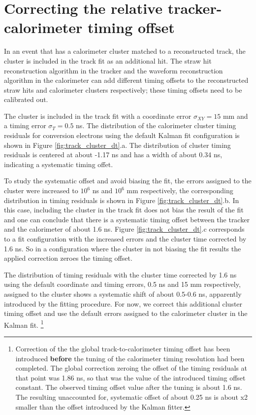 \section{Correcting the relative tracker-calorimeter timing offset}

In an event that has a calorimeter cluster matched to a reconstructed track, the
cluster is included in the track fit as an additional hit. 
%
The straw hit reconstruction algorithm in the tracker and the waveform reconstruction 
algorithm in the calorimeter can add different timing offsets to the reconstructed straw hits
and calorimeter clusters respectively; these timing offsets need to be calibrated out.

The cluster is included in the track fit with a coordinate error $\sigma_{XY} = 15$ mm
and a timing error $\sigma_T = 0.5$ ns.
The distribution of the calorimeter cluster timing residuals for conversion electrons
using the default Kalman fit configuration is shown in Figure \ref{fig:track_cluster_dt}.a. 
The distribution of cluster timing residuals 
is centered at about -1.17 ns and has a width of about 0.34 ns, indicating a systematic timing offet.

To study the systematic offset and avoid biasing the fit, the errors assigned to the 
cluster were increased to $10^6$ ns and $10^6$ mm respectively,
the corresponding distribution in timing residuals is shown in Figure 
\ref{fig:track_cluster_dt}.b.
%
In this case, including the cluster in the track fit does not bias the result of the fit
and one can conclude that there is a systematic timing offset between the tracker
and the calorimeter of about 1.6 ns.
%
Figure \ref{fig:track_cluster_dt}.c corresponds to a fit configuration with
the increased errors and the cluster time corrected by 1.6 ns. So in a configuration
where the cluster in not biasing the fit results the applied correction zeroes
the timing offset.

The distribution of timing residuals with the cluster time corrected by 1.6 ns using
the default coordinate and timing errors, 0.5 ns and 15 mm respectively, 
assigned to the cluster shows a systematic shift of about 0.5-0.6 ns,
apparently introduced by the fitting procedure.
For now, we correct this additional cluster timing offset and use the default errors
assigned to the calorimeter cluster in the Kalman fit.
\footnote{
  Correction of the the global track-to-calorimeter timing offset has been introduced
  {\bf before} the tuning of the calorimeter timing resolution had been completed. 
  The global correction zeroing the offset of the timing residuals at that point 
  was 1.86 ns, so that was the value of the introduced timing offset constant.
  The observed timing offset value after the tuning is about 1.6 ns. 
  The resulting unaccounted for, systematic offset of about 0.25 ns is about x2 smaller
  than the offset introduced by the Kalman fitter.
}

